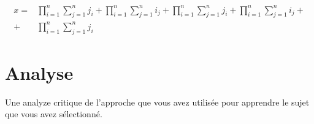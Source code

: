 \documentclass{article}
\begin{document}
\begin{align}
    x =& \prod_{i=1}^n \sum_{j=1}^n j_i + \prod_{i=1}^n \sum_{j=1}^n i_j + \prod_{i=1}^n \sum_{j=1}^n j_i + \prod_{i=1}^n \sum_{j=1}^n i_j + \nonumber\\
    + & \prod_{i=1}^n \sum_{j=1}^n j_i
\end{align}

\section{Analyse}

Une analyze critique de l'approche que vous avez utilisée pour apprendre le sujet que vous avez sélectionné.




\end{document}
